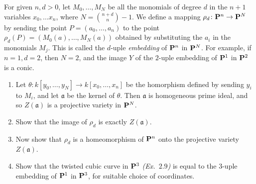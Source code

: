 \documentclass[10pt]{amsart}
\begin{document}
\begin{exercise}[2.12]
    For given $n, d>0$, let
    $M_0,\ldots, M_N$ be all the monomials of degree $d$ in the $n+1$ variables
    $x_0, \ldots x_n$, where $N = \binom{n+d}{n} -1.$ We define a mapping
    $\rho_d\colon {\bf P}^n \to {\bf P}^N$ by sending the point $P = (a_0, \ldots, a_n)$
    to the point $\rho_d(P) = (M_0(a), \ldots, M_N(a))$ obtained by substituting
    the $a_i$ in the monomials $M_j$. This is called the $d$-uple \emph{embedding}
    of ${\bf P}^n$ in ${\bf P}^N$. For example, if $n=1, d=2$, then $N= 2$, and the image
    $Y$ of the $2$-uple embedding of ${\bf P}^1$ in ${\bf P}^2$ is a conic. 
    \begin{enumerate}
      \item Let $\theta\colon k[y_0, \ldots, y_N] \to k[x_0, \ldots, x_n]$ be the
        homorphism defined by sending $y_i$ to $M_i$, and let $\mathfrak{a}$ be
        the kernel of $\theta$. Then $\mathfrak{a}$ is homogeneous prime ideal, and
        so $Z(\mathfrak{a})$ is a projective variety in ${\bf P}^N$. 
      \item Show that the image of $\rho_d$ is exactly $Z(\mathfrak{a})$.
      \item Now show that $\rho_d$ is a homeomorphism of ${\bf P}^n$ onto the projective
        variety $Z(\mathfrak{a})$. 
      \item Show that the twisted cubic curve in ${\bf P}^3$
        {\emph{(Ex.\ $2.9$)}} is equal to the $3$-uple
        embedding of ${\bf P}^1$ in ${\bf P}^3$, for suitable choice of coordinates. 
    \end{enumerate}
\end{exercise}
\end{document}
